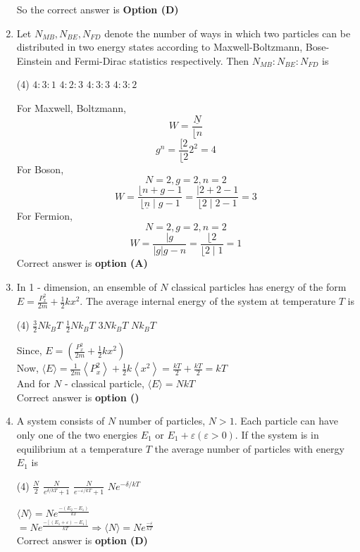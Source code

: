 \begin{enumerate}
\begin{answer}
So the correct answer is \textbf{Option (D)}
\end{answer}
	\item Let $N_{M B}, N_{B E}, N_{F D}$ denote the number of ways in which two particles can be distributed in two energy states according to Maxwell-Boltzmann, Bose-Einstein and Fermi-Dirac statistics respectively. Then $N_{M B}: N_{B E}: N_{F D}$ is
\begin{tasks}(4)
\task[\textbf{A.}]  $4: 3: 1$
\task[\textbf{B.}]  $4: 2: 3$
\task[\textbf{C.}] $4: 3: 3$
\task[\textbf{D.}] $4: 3: 2$
\end{tasks}
\begin{answer}
For Maxwell, Boltzmann, $$W=\frac{\underline{N}}{\lfloor n}$$ $$g^{n}=\frac{[2}{\lfloor 2} 2^{2}=4$$
For Boson, $$N=2, g=2, n=2$$ 
$$ W=\frac{\lfloor n+g-1}{\lfloor\underline{n} \mid g-1}=\frac{\mid 2+2-1}{\lfloor 2 \mid 2-1}=3$$
For Fermion, $$N=2, g=2, n=2$$
$$ W=\frac{\mid g}{|g| g-n}=\frac{\lfloor 2}{\lfloor 2 \mid 1}=1$$
Correct answer is \textbf{option (A)}
\end{answer}
\item In 1 - dimension, an ensemble of $N$ classical particles has energy of the form $E=\frac{P_{x}^{2}}{2 m}+\frac{1}{2} k x^{2}$. The average internal energy of the system at temperature $T$ is 
\begin{tasks}(4)
\task[\textbf{A.}] $\frac{3}{2} N k_{B} T$
\task[\textbf{B.}] $\frac{1}{2} N k_{B} T$ 
\task[\textbf{C.}] $3 N k_{B} T$
\task[\textbf{D.}] $N k_{B} T$
\end{tasks}
\begin{answer}
Since, $E=\left(\frac{P_{x}^{2}}{2 m}+\frac{1}{2} k x^{2}\right)$\\
Now, $\langle E\rangle=\frac{1}{2 m}\left\langle P_{x}^{2}\right\rangle+\frac{1}{2} k\left\langle x^{2}\right\rangle=\frac{k T}{2}+\frac{k T}{2}=k T$\\
And for $N$ - classical particle, $\langle E\rangle=N k T$\\
Correct answer is \textbf{option ()}
\end{answer}	
	\item A system consists of $N$ number of particles, $N>1 .$ Each particle can have only one of the two energies $E_{1}$ or $E_{1}+\varepsilon(\varepsilon>0) .$ If the system is in equilibrium at a temperature $T$ the average number of particles with energy $E_{1}$ is
\begin{tasks}(4)
\task[\textbf{A.}] $\frac{N}{2}$
\task[\textbf{B.}] $\frac{N}{e^{\delta / k T}+1}$ 
\task[\textbf{C.}] $\frac{N}{e^{-\varepsilon / k T}+1}$
\task[\textbf{D.}] $N e^{-\delta / k T}$
\end{tasks}
\begin{answer}
$\langle N\rangle=N e^{\frac{-\left(E_{2}-E_{1}\right)}{k T}}$\\
$=N e^{\frac{-\left[\left(E_{1}+\varepsilon\right)-E_{1}\right]}{k T}} \Rightarrow\langle N\rangle=N e^{\frac{-\varepsilon}{k T}}$\\
Correct answer is \textbf{option (D)}
\end{answer}
	

\end{enumerate}
